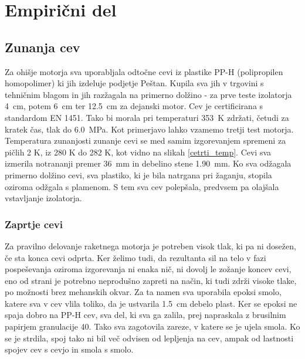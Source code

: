 \documentclass[titlepage, a4paper, twoside, final, 12pt]{article}
\begin{document}
		\section{Empirični del}
		
			\subsection{Zunanja cev}
			Za ohišje motorja sva uporabljala odtočne cevi iz plastike PP-H (polipropilen homopolimer) ki jih izdeluje podjetje Peštan. Kupila sva jih v trgovini s tehničnim blagom
			in jih razžagala na primerno dolžino - za prve teste izolatorja \SI{4}{cm}, potem \SI{6}{cm} ter \SI{12,5}{cm} za dejanski motor.
			Cev je certificirana s standardom EN 1451.\cite{Katalog_HTPP} Tako bi morala pri temperaturi \SI{353}{K} zdržati, četudi za kratek čas, tlak do \SI{6,0}{MPa}.\cite{EN1451} Kot primerjavo lahko vzamemo tretji test motorja. Temperatura zunanjosti zunanje cevi se med samim izgorevanjem spremeni za pičlih 2 K, iz 280 K do 282 K, kot vidno na slikah \ref{cetrti_temp}.
			Cevi sva izmerila notrananji premer \SI{36}{mm} in debelino stene \SI{1.90}{mm}. Ko sva odžagala primerno dolžino cevi, sva plastiko,
			ki je bila natrgana pri žaganju, stopila oziroma odžgala s plamenom. 
			S tem sva cev polepšala, predvsem pa olajšala vstavljanje izolatorja.
			
				\subsubsection{Zaprtje cevi}
				Za pravilno delovanje raketnega motorja je potreben visok tlak, ki pa ni dosežen, če sta konca cevi odprta. Ker želimo tudi, da rezultanta sil na telo v fazi pospeševanja
				oziroma izgorevanja ni enaka nič, ni dovolj le zožanje koncev cevi, eno od strani je potrebno neprodušno zapreti na način, ki tudi zdrži visoke tlake, po možnosti brez
				mehanskih okvar. Za ta namen sva uporabila epoksi smolo, katere sva v cev vlila toliko, da je ustvarila \SI{1,5}{cm} debelo plast.\cite{matweb_epoxy_cure_resin}
				Ker se epoksi ne spaja dobro na PP-H cev,
				sva del, ki sva ga zalila, prej napraskala z brusilnim papirjem granulacije 40.\cite{3m_lse_adhesion} Tako sva zagotovila zareze, v katere se je ujela smola.
				Ko se je strdila, spoj tako ni bil več odvisen od lepljenja na cev,
				ampak od lastnosti spojev cev s cevjo in smola s smolo. 
	 
				
			
\end{document}
